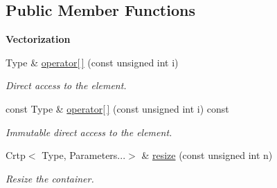\subsection*{Public Member Functions}
\begin{Indent}{\bf Vectorization}\par
\begin{DoxyCompactItemize}
\item 
Type \& \hyperlink{classmagrathea_1_1StaticVectorizer_a4b5d5e63c27e77f1d734f80d7ca3d2df}{operator\mbox{[}$\,$\mbox{]}} (const unsigned int i)
\begin{DoxyCompactList}\small\item\em Direct access to the element. \end{DoxyCompactList}\item 
const Type \& \hyperlink{classmagrathea_1_1StaticVectorizer_adf04553a28c73c6a6d04f2d29c8cdfeb}{operator\mbox{[}$\,$\mbox{]}} (const unsigned int i) const 
\begin{DoxyCompactList}\small\item\em Immutable direct access to the element. \end{DoxyCompactList}\item 
Crtp$<$ Type, Parameters...$>$ \& \hyperlink{classmagrathea_1_1StaticVectorizer_a41dd9d48122248b8ee10d1ef372cd560}{resize} (const unsigned int n)
\begin{DoxyCompactList}\small\item\em Resize the container. \end{DoxyCompactList}\end{DoxyCompactItemize}
\end{Indent}
